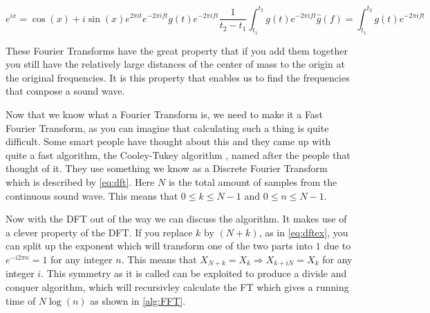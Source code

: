 \begin{subequations}
    \begin{equation}
        e^{ix} = \cos(x) + i\sin(x)
        \label{eq:euler}
    \end{equation}
    \begin{equation}
        e^{2\pi it}
        \label{eq:euler rotate}
    \end{equation}
    \begin{equation}
        e^{-2\pi ift}
        \label{eq:euler freq}
    \end{equation}
    \begin{equation}
        g(t)e^{-2\pi ift}
        \label{eq:euler wave}
    \end{equation}
    \begin{equation}
        \frac{1}{t_2 - t_1}\int^{t_2}_{t_1}g(t)e^{-2\pi ift}
        \label{eq:euler int}
    \end{equation}
    \begin{equation}
        \hat{g}(f) = \int^{t_2}_{t_1}g(t)e^{-2\pi ift}
        \label{eq:ft}
    \end{equation}
\end{subequations}

These Fourier Transforms have the great property that if you add them together you still have the relatively large distances of the center of mass to the origin at the original frequencies. It 
is this property that enables us to find the frequencies that compose a sound wave. 

Now that we know what a Fourier Transform is, we need to make it a Fast Fourier Transform, as you can imagine that calculating such a thing is quite difficult. Some smart people have thought
about this and they came up with quite a fast algorithm, the Cooley-Tukey algorithm \cite{fft}, named after the people that thought of it. They use something we know as a Discrete Fourier 
Transform which is described by \autoref{eq:dft}. Here $N$ is the total amount of samples from the continuous sound wave. This means that $0 \leq k \leq N - 1$ and $0 \leq n \leq N - 1$.

Now with the DFT out of the way we can discuss the algorithm. It makes use of a clever property of the DFT. If you replace $k$ by $(N + k)$, as in \autoref{eq:dftex}, you can split up the 
exponent which will transform one of the two parts into $1$ due to $e^{-i2\pi n} = 1$ for any integer $n$. This means that $X_{N + k} = X_k \Rightarrow X_{k + iN} = X_k$ for any integer $i$. 
This symmetry as it is called can be exploited to produce a divide and conquer algorithm, which will recursivley calculate the FT which gives a running time of $N\log(n)$ as shown in 
\autoref{alg:FFT}.

